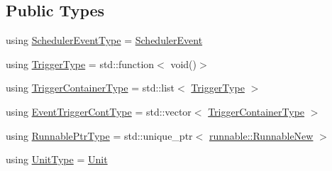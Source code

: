 \subsection*{Public Types}
\begin{DoxyCompactItemize}
\item 
using \hyperlink{structvt_1_1sched_1_1_scheduler_ad40b8136b7810da5bab9b27e317e4eb3}{Scheduler\+Event\+Type} = \hyperlink{namespacevt_1_1sched_a54756ec39b60951d6765fcfa692d1616}{Scheduler\+Event}
\item 
using \hyperlink{structvt_1_1sched_1_1_scheduler_aa0c06d6e1c31a5f1c3db474036ad7d29}{Trigger\+Type} = std\+::function$<$ void()$>$
\item 
using \hyperlink{structvt_1_1sched_1_1_scheduler_a0b9fe2a5ee31ca84fa52764a126ad666}{Trigger\+Container\+Type} = std\+::list$<$ \hyperlink{structvt_1_1sched_1_1_scheduler_aa0c06d6e1c31a5f1c3db474036ad7d29}{Trigger\+Type} $>$
\item 
using \hyperlink{structvt_1_1sched_1_1_scheduler_a68203230dc48285d3d50bbb363ed267b}{Event\+Trigger\+Cont\+Type} = std\+::vector$<$ \hyperlink{structvt_1_1sched_1_1_scheduler_a0b9fe2a5ee31ca84fa52764a126ad666}{Trigger\+Container\+Type} $>$
\item 
using \hyperlink{structvt_1_1sched_1_1_scheduler_a0bc4ead96e12a5c516afebc8b1cb0b79}{Runnable\+Ptr\+Type} = std\+::unique\+\_\+ptr$<$ \hyperlink{structvt_1_1runnable_1_1_runnable_new}{runnable\+::\+Runnable\+New} $>$
\item 
using \hyperlink{structvt_1_1sched_1_1_scheduler_a398229f29b0940cea85aba4bae78b0be}{Unit\+Type} = \hyperlink{namespacevt_1_1sched_a3f19a4714fc5d9f901b45665a9d794d5}{Unit}
\end{DoxyCompactItemize}

